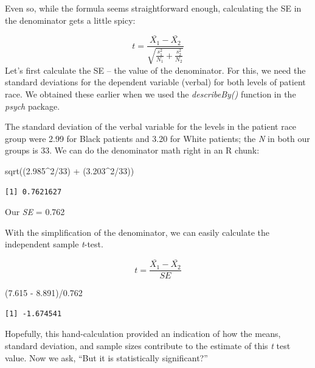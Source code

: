 \documentclass[
  11pt,
]{book}
\newenvironment{Shaded}{\begin{snugshade}}{\end{snugshade}}
\newcommand{\DecValTok}[1]{\textcolor[rgb]{0.00,0.00,0.81}{#1}}
\newcommand{\FloatTok}[1]{\textcolor[rgb]{0.00,0.00,0.81}{#1}}
\newcommand{\FunctionTok}[1]{\textcolor[rgb]{0.00,0.00,0.00}{#1}}
\newcommand{\NormalTok}[1]{#1}
\newcommand{\SpecialCharTok}[1]{\textcolor[rgb]{0.00,0.00,0.00}{#1}}
\begin{document}
Even so, while the formula seems straightforward enough, calculating the SE in the denominator gets a little spicy:

\[t = \frac{\bar{X_{1}} -\bar{X_{2}}}{\sqrt{\frac{s_{1}^{2}}{N_{1}}+\frac{s_{2}^{2}}{N_{2}}}}\]
Let's first calculate the SE -- the value of the denominator. For this, we need the standard deviations for the dependent variable (verbal) for both levels of patient race. We obtained these earlier when we used the \emph{describeBy()} function in the \emph{psych} package.

The standard deviation of the verbal variable for the levels in the patient race group were 2.99 for Black patients and 3.20 for White patients; the \emph{N} in both our groups is 33. We can do the denominator math right in an R chunk:

\begin{Shaded}
\begin{Highlighting}[]
\FunctionTok{sqrt}\NormalTok{((}\FloatTok{2.985}\SpecialCharTok{\^{}}\DecValTok{2}\SpecialCharTok{/}\DecValTok{33}\NormalTok{) }\SpecialCharTok{+}\NormalTok{ (}\FloatTok{3.203}\SpecialCharTok{\^{}}\DecValTok{2}\SpecialCharTok{/}\DecValTok{33}\NormalTok{))}
\end{Highlighting}
\end{Shaded}

\begin{verbatim}
[1] 0.7621627
\end{verbatim}

Our \emph{SE} = 0.762

With the simplification of the denominator, we can easily calculate the independent sample \emph{t}-test.

\[t = \frac{\bar{X_{1}} -\bar{X_{2}}}{SE}\]

\begin{Shaded}
\begin{Highlighting}[]
\NormalTok{(}\FloatTok{7.615} \SpecialCharTok{{-}} \FloatTok{8.891}\NormalTok{)}\SpecialCharTok{/}\FloatTok{0.762}
\end{Highlighting}
\end{Shaded}

\begin{verbatim}
[1] -1.674541
\end{verbatim}

Hopefully, this hand-calculation provided an indication of how the means, standard deviation, and sample sizes contribute to the estimate of this \emph{t} test value. Now we ask, ``But it is statistically significant?''
\end{document}
